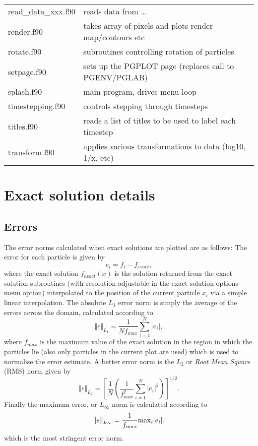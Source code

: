 \documentclass[a4paper,11pt]{article}
\begin{document}
\begin{longtable}{|lp{}|}
     read\_data\_xxx.f90 & reads data from \ldots \\ 
     render.f90	 	 & takes array of pixels and plots render map/contours etc\\
     rotate.f90             & subroutines controlling rotation of particles\\
     setpage.f90            & sets up the PGPLOT page (replaces call to PGENV/PGLAB)\\
     splash.f90	 & main program, drives menu loop\\
     timestepping.f90       & controls stepping through timesteps\\
     titles.f90        & reads a list of titles to be used to label each timestep\\
     transform.f90	 	 & applies various transformations to data (log10, 1/x, etc) \\
\end{longtable}

\section{Exact solution details}
\label{sec:exact}
\subsection{Errors}
The error norms calculated when exact solutions are plotted are as follows: The
error for each particle is given by
\begin{equation}
e_i = f_i - f_{exact},
\end{equation}
where the exact solution $f_{exact}(x)$ is the solution returned from the exact
solution subroutines (with resolution adjustable in the exact solution options menu
option) interpolated to the position of the current particle $x_i$ via a simple linear
interpolation. The absolute $L_1$ error norm is simply the average of the errors across
the domain, calculated according to
\begin{equation}
\Vert e \Vert_{L_1} = \frac{1}{N f_{max}} \sum_{i=1}^N \vert e_i \vert,
\end{equation}
where $f_{max}$ is the maximum value of the exact solution in the region in which the
particles lie (also only particles in the current plot are used) which is used to
normalise the error estimate. A better error norm is the $L_2$ or \emph{Root Mean Square}
 (RMS) norm given by
\begin{equation}
\Vert e \Vert_{L_2} = \left[\frac{1}{N} \left( \frac{1}{f_{max}^2} \sum_{i=1}^N \vert e_i
\vert^2 \right)\right]^{1/2}.
\end{equation}
Finally the maximum error, or $L_\infty$ norm is calculated according to
\begin{equation}
\Vert e \Vert_{L_\infty} = \frac{1}{f_{max}} {\rm max}_i \vert e_i \vert.
\end{equation}
which is the most stringent error norm.
\end{document}
